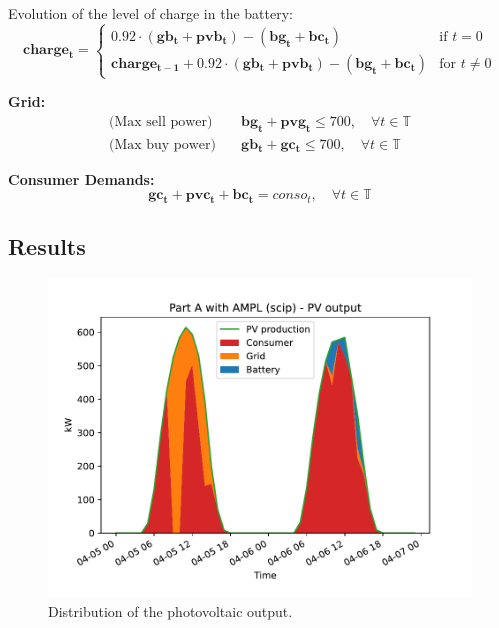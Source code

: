 \documentclass[12pt]{article}
\newcommand{\VAR}[1]{\mathbf{#1}}
\newcommand{\T}{\mathbb{T}}
\begin{document}
Evolution of the level of charge in the battery:
\begin{equation}
    \VAR{charge_t} =
    \begin{cases}
        0.92 \cdot (\VAR{gb_t} + \VAR{pvb_t}) - (\VAR{bg_t} + \VAR{bc_t}) & \text{if } t = 0 \\
        \VAR{charge_{t-1}} + 0.92 \cdot (\VAR{gb_t} + \VAR{pvb_t}) - (\VAR{bg_t} + \VAR{bc_t}) & \text{for } t \neq 0
    \end{cases}
\end{equation}

\textbf{Grid:}
\begin{align}
\text{(Max sell power)} & \quad \VAR{bg_t} + \VAR{pvg_t} \leq 700, \quad \forall t \in \T \\
\text{(Max buy power)} & \quad \VAR{gb_t} + \VAR{gc_t} \leq 700, \quad \forall t \in \T
\end{align}

\textbf{Consumer Demands:}
\begin{equation}
    \VAR{gc_t} + \VAR{pvc_t} + \VAR{bc_t} = conso_t, \quad \forall t \in \T
\end{equation}

\subsection{Results}
\begin{figure}[p]
    \centering
    \includegraphics[width=\textwidth]{PartA/pv_output}
    \caption{Distribution of the photovoltaic output.}
\end{figure}
\end{document}
